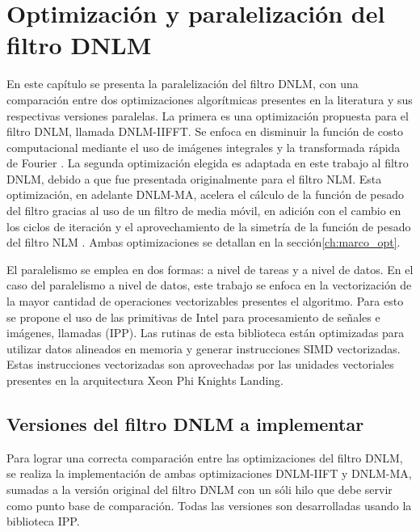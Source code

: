\chapter{Optimización y paralelización del filtro DNLM}
\label{ch:solucion}

En este capítulo se presenta la paralelización del filtro DNLM, con una comparación entre dos optimizaciones algorítmicas presentes en la literatura y sus respectivas versiones paralelas. La primera es una optimización propuesta para el filtro DNLM, llamada DNLM-IIFFT. Se enfoca en disminuir la función de costo computacional mediante el uso de imágenes integrales y la transformada rápida de Fourier \cite{CalderonRamirez2017}. La segunda optimización elegida es adaptada en este trabajo al filtro DNLM, debido a que fue presentada originalmente para el filtro NLM. Esta optimización, en adelante DNLM-MA, acelera el cálculo de la función de pesado del filtro gracias al uso de un filtro de media móvil, en adición con el cambio en los ciclos de iteración y el aprovechamiento de la simetría de la función de pesado del filtro NLM \cite{Condat2010}. Ambas optimizaciones se detallan en la sección\ref{ch:marco_opt}.

El paralelismo se emplea en dos formas: a nivel de tareas y a nivel de datos. En el caso del paralelismo a nivel de datos, este trabajo se enfoca en la vectorización de la mayor cantidad de operaciones vectorizables presentes el algoritmo. Para esto se propone el uso de las primitivas de Intel para procesamiento de se\~nales e imágenes, llamadas  (IPP). Las rutinas de esta biblioteca están optimizadas para utilizar datos alineados en memoria y generar instrucciones SIMD vectorizadas. Estas instrucciones vectorizadas son aprovechadas por las unidades vectoriales presentes en la arquitectura Xeon Phi Knights Landing.



\section{Versiones del filtro DNLM a implementar}

Para lograr una correcta comparación entre las optimizaciones del filtro DNLM, se realiza la implementación de ambas optimizaciones DNLM-IIFT y DNLM-MA, sumadas a la versión original del filtro DNLM con un sóli hilo que debe servir como punto base de comparación. Todas las versiones son desarrolladas usando la biblioteca IPP.


